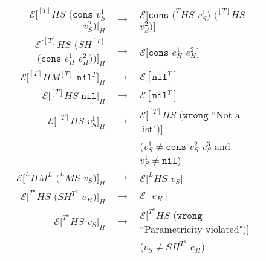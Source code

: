 \begin{figure}
\begin{center}
\begin{tabular}{rcl}
$\mathscr{E}[^{[T]}HS$ $(\mathtt{cons}$ $v_{S}^{1}$ $v_{S}^{2})]_{H}$ & $\rightarrow$ & $\mathscr{E}[\mathtt{cons}$ $(^{T}HS$ $v_{S}^{1})$ $(^{[T]}HS$ $v_{S}^{2})]$ \\
$\mathscr{E}[^{[T]}HS$ $(SH^{[T]}$ $(\mathtt{cons}$ $e_{H}^{1}$ $e_{H}^{2}))]_{H}$ & $\rightarrow$ & $\mathscr{E}[\mathtt{cons}$ $e_{H}^{1}$ $e_{H}^{2}]$ \\
$\mathscr{E}[^{[T]}HM^{[T]}$ $\mathtt{nil}^{T}]_{H}$ & $\rightarrow$ & $\mathscr{E}[\mathtt{nil}^{T}]$ \\
$\mathscr{E}[^{[T]}HS$ $\mathtt{nil}]_{H}$ & $\rightarrow$ & $\mathscr{E}[\mathtt{nil}^{T}]$ \\
$\mathscr{E}[^{[T]}HS$ $v_{S}^{1}]_{H}$ & $\rightarrow$ & $\mathscr{E}[^{[T]}HS$ $(\mathtt{wrong}$ ``Not a list"$)]$ \\
&& ($v_{S}^{1}\neq\mathtt{cons}$ $v_{S}^{2}$ $v_{S}^{3}$ and $v_{S}^{1}\neq\mathtt{nil}$) \\
$\mathscr{E}[^{L}HM^{L}$ $(^{L}MS$ $v_{S})]_{H}$ & $\rightarrow$ & $\mathscr{E}[^{L}HS$ $v_{S}]$ \\
$\mathscr{E}[^{T^{a}}HS$ $(SH^{T^{a}}$ $e_{H})]_{H}$ & $\rightarrow$ & $\mathscr{E}[e_{H}]$ \\
$\mathscr{E}[^{T^{a}}HS$ $v_{S}]_{H}$ & $\rightarrow$ & $\mathscr{E}[^{T^{a}}HS$ $(\mathtt{wrong}$ ``Parametricity violated"$)]$ \\
&& ($v_{S}\neq SH^{T^{a}}$ $e_{H}$)
\end{tabular}
\end{center}
\end{figure}